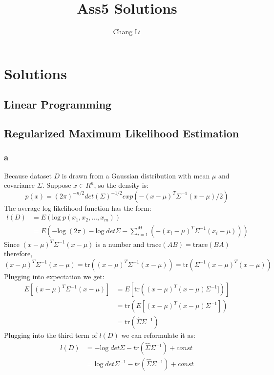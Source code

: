 \documentclass[10pt,a4paper]{article}
\begin{document}
\title{Ass5 Solutions}
\author{Chang Li}
\maketitle

\section{Solutions}

\subsection{Linear Programming}



\subsection{Regularized Maximum Likelihood Estimation}

\subsubsection{a}
Because dataset $D$ is drawn from a Gaussian distribution
with mean $\mu$ and covariance $\Sigma$. Suppose $x\in R^n$,
so the density is:
$$p(x) = (2\pi)^{-n/2}det(\Sigma)^{-1/2}exp(-(x-\mu)^T\Sigma^{-1}(x-\mu)/2)$$
The average log-likelihood function has the form:
\begin{align*}
  l(D) & = E(\text{log}\;p(x_1,x_2,\dots,x_m))\\
       & = E(-\text{log}\;(2\pi) - \text{log}\;det\Sigma
  - \sum_{i=1}^{M}(-(x_i-\mu)^T\Sigma^{-1}(x_i-\mu)))
\end{align*}
Since $(x-\mu)^T\Sigma^{-1}(x-\mu)$ is a number and
$\mathrm{trace}(AB)=\mathrm{trace}(BA)$ therefore,
$$(x-\mu)^T\Sigma^{-1}(x-\mu)= \mathrm{tr}((x-\mu)^T\Sigma^{-1}(x-\mu))=\mathrm{tr}(\Sigma^{-1}(x-\mu)^T(x-\mu))$$ 
Plugging into expectation we get:
\begin{align*}
E[(x-\mu)^T\Sigma^{-1}(x-\mu)] &= E[\mathrm{tr}((x-\mu)^T(x-\mu)\Sigma^{-1}] )] \\
&= \mathrm{tr}(E[(x-\mu)^T(x-\mu)\Sigma^{-1}])\\
&= \mathrm{tr}(\hat{\Sigma}\Sigma^{-1})
\end{align*}
Plugging into the third term of $l(D)$ we can reformulate it as:
\begin{align*}
     l(D) &=- \text{log}\;det\Sigma - tr(\hat{\Sigma}\Sigma^{-1} )+ const \\
       & = \text{log}\;det\Sigma^{-1} - tr(\hat{\Sigma}\Sigma^{-1} ) + const 
\end{align*}
\end{document}
